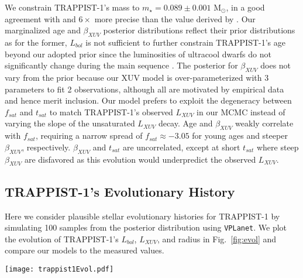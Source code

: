 \documentclass[twocolumn]{aastex62}
\newcommand{\vplanet}[0]{\texttt{VPLanet}\xspace}
\begin{document}
We constrain TRAPPIST-1's mass to $m_{\star} = 0.089 \pm{0.001}$ M$_{\odot}$, in a good agreement with and $6\times$ more precise than the value derived by \citet{vanGrootel2018}. Our marginalized age and $\beta_{XUV}$ posterior distributions reflect their prior distributions as for the former, $L_{bol}$ is not sufficient to further constrain TRAPPIST-1's age beyond our adopted prior since the luminosities of ultracool dwarfs do not significantly change during the main sequence \citep{Baraffe2015}. The posterior for $\beta_{XUV}$ does not vary from the prior because our XUV model is over-parameterized with 3 parameters to fit 2 observations, although all are motivated by empirical data and hence merit inclusion. Our model prefers to exploit the degeneracy between $f_{sat}$ and $t_{sat}$ to match TRAPPIST-1's observed $L_{XUV}$ in our MCMC instead of varying the slope of the unsaturated $L_{XUV}$ decay. Age and $\beta_{XUV}$ weakly correlate with $f_{sat}$, requiring a narrow spread of $f_{sat} \approx -3.05$ for young ages and steeper $\beta_{XUV}$, respectively. $\beta_{XUV}$ and $t_{sat}$ are uncorrelated, except at short $t_{sat}$ where steep $\beta_{XUV}$ are disfavored as this evolution would underpredict the observed $L_{XUV}$.

\subsection{TRAPPIST-1's Evolutionary History}

Here we consider plausible stellar evolutionary histories for TRAPPIST-1 by simulating 100 samples from the posterior distribution using \vplanet. We plot the evolution of TRAPPIST-1's $L_{bol}$, $L_{XUV}$, and radius in Fig.~\ref{fig:evol} and compare our models to the measured values. 

\begin{figure*}[t]
	\texttt{[image: trappist1Evol.pdf]}
   \caption{Plausible evolutionary histories of TRAPPIST-1's $L_{bol}$ (left), $L_{XUV}$ (center), and radius (right) using 100 samples drawn from the posterior distribution and simulated with \vplanet. In each panel, the blue shaded regions display the 1, 2, and 3 $\sigma$ uncertainties. The insets display the marginalized distributions (black) evaluated at the age of the system, with the blue dashed lines indicating the observed value and +/- 1 $\sigma$ uncertainties. The radius, $L_{bol}$, and $L_{XUV}$ constraints are adopted from \citet{vanGrootel2018} and \citet{Wheatley2017}, respectively.}%
    \label{fig:evol}%
\end{figure*}
\end{document}
